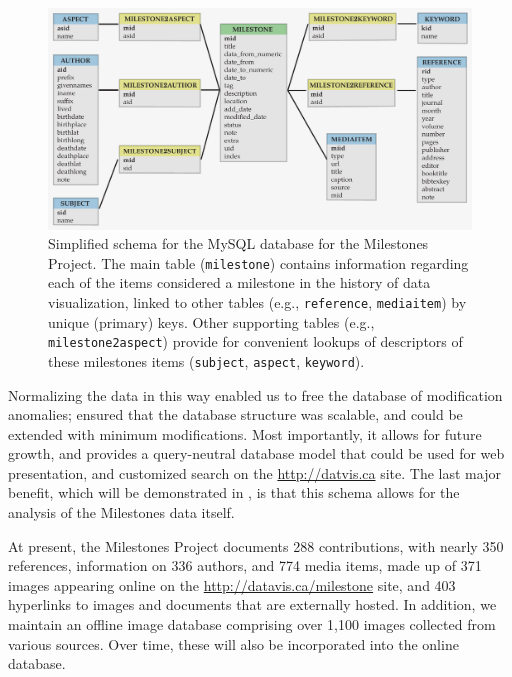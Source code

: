 \begin{figure}[!htb]
  \centering
  \includegraphics[width=\textwidth,clip]{fig/datavis-schema-3}
  \caption{Simplified schema for the MySQL database for the Milestones Project. The main 
  table (\texttt{milestone}) contains information regarding each of the items considered a milestone in the history of data visualization, linked to other tables (e.g., \texttt{reference}, \texttt{mediaitem}) by unique (primary) keys. Other supporting tables (e.g., \texttt{milestone2aspect}) provide for convenient lookups of descriptors of these milestones items (\texttt{subject}, \texttt{aspect}, \texttt{keyword}).
  }
  \label{fig:datavis-schema-2}
\end{figure}

Normalizing the data in this way enabled us to free the database of modification anomalies; ensured that the database structure was scalable, and could be extended with minimum modifications. Most importantly, it allows for future growth, and provides a query-neutral database model \citep{Codd:1971} that could be used for web presentation, and customized search on the \url{http://datvis.ca} site. The last major benefit, which will be demonstrated in , is that this schema allows for the analysis of the Milestones data itself.

At present, the Milestones Project documents 288 contributions, with nearly 350 references, information on 336 authors, and 774 media items, made up of 371 images appearing online on the \url{http://datavis.ca/milestone} site, and 403 hyperlinks to images and documents that are externally hosted. In addition, we maintain an offline image database comprising over 1,100 images collected from various sources. Over time, these will also be incorporated into the online database.

